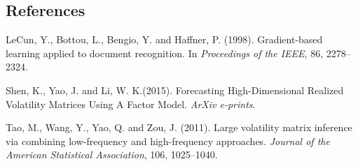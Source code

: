 \documentclass[12pt]{article}
\begin{document}
%
%
%

\subsection*{References}

\begin{description}

\item
LeCun, Y., Bottou, L., Bengio, Y. and Haffner, P. (1998). 
Gradient-based learning applied to document recognition. In 
\textit{Proceedings of the IEEE}, 86, 2278--2324.

\item
Shen, K., Yao, J. and Li, W. K.(2015). Forecasting High-Dimensional Realized Volatility
Matrices Using A Factor Model. \textit{ArXiv e-prints}.

\item
Tao, M., Wang, Y., Yao, Q. and Zou, J. (2011). 
Large volatility matrix inference via combining low-frequency and high-frequency approaches. \textit{Journal of the American Statistical Association},
106, 1025--1040.


\end{description}
\end{document}
